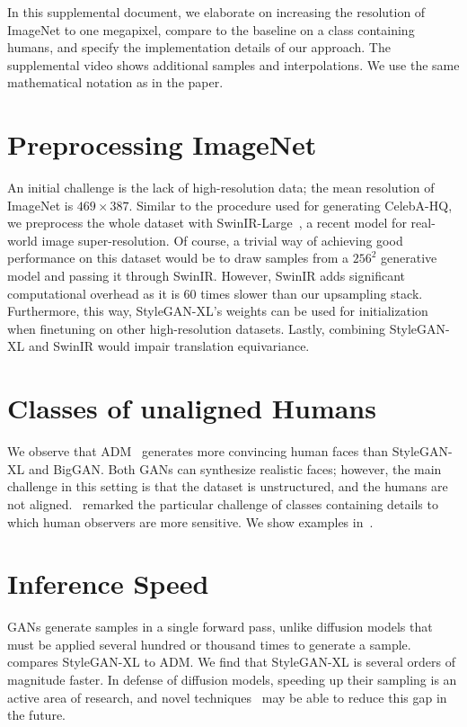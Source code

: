In this supplemental document, we elaborate on increasing the resolution of ImageNet to one megapixel, compare to the baseline on a class containing humans, and specify the implementation details of our approach. The supplemental video shows additional samples and interpolations. We use the same mathematical notation as in the paper.

\section{Preprocessing ImageNet}
An initial challenge is the lack of high-resolution data; the mean resolution of ImageNet is $469\times387$.
Similar to the procedure used for generating CelebA-HQ\cite{Karras2018ICLR}, we preprocess the whole dataset with SwinIR-Large~\cite{Liang2021ICCV}, a recent model for real-world image super-resolution.
Of course, a trivial way of achieving good performance on this dataset would be to draw samples from a $256^2$ generative model and passing it through SwinIR. However, SwinIR adds significant computational overhead as it is $60$ times slower than our upsampling stack. Furthermore, this way, StyleGAN-XL's weights can be used for initialization when finetuning on other high-resolution datasets. Lastly, combining StyleGAN-XL and SwinIR would impair translation equivariance.

\section{Classes of unaligned Humans}
We observe that ADM~\cite{Dhariwal2021NEURIPS} generates more convincing human faces than StyleGAN-XL and BigGAN. Both GANs can synthesize realistic faces; however, the main challenge in this setting is that the dataset is unstructured, and the humans are not aligned.~\cite{Brock2019ICLR} remarked the particular challenge of classes containing details to which human observers are more sensitive. We show examples in~.
\aquamen


\section{Inference Speed}
GANs generate samples in a single forward pass, unlike diffusion models that must be applied several hundred or thousand times to generate a sample.  compares StyleGAN-XL to ADM. We find that StyleGAN-XL is several orders of magnitude faster. In defense of diffusion models, speeding up their sampling is an active area of research, and novel techniques~\cite{Watson2021ARXIV} may be able to reduce this gap in the future.
\speedcomparison

